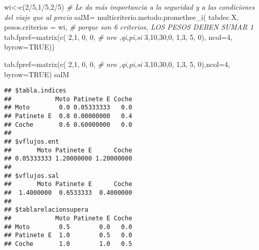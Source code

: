 \documentclass[
]{article}
\newenvironment{Shaded}{\begin{snugshade}}{\end{snugshade}}
\newcommand{\AttributeTok}[1]{\textcolor[rgb]{0.77,0.63,0.00}{#1}}
\newcommand{\CommentTok}[1]{\textcolor[rgb]{0.56,0.35,0.01}{\textit{#1}}}
\newcommand{\ConstantTok}[1]{\textcolor[rgb]{0.00,0.00,0.00}{#1}}
\newcommand{\DecValTok}[1]{\textcolor[rgb]{0.00,0.00,0.81}{#1}}
\newcommand{\FunctionTok}[1]{\textcolor[rgb]{0.00,0.00,0.00}{#1}}
\newcommand{\NormalTok}[1]{#1}
\newcommand{\OtherTok}[1]{\textcolor[rgb]{0.56,0.35,0.01}{#1}}
\newcommand{\SpecialCharTok}[1]{\textcolor[rgb]{0.00,0.00,0.00}{#1}}
\begin{document}
\begin{Shaded}
\begin{Highlighting}[]
\NormalTok{wi}\OtherTok{\textless{}{-}}\FunctionTok{c}\NormalTok{(}\DecValTok{2}\SpecialCharTok{/}\DecValTok{5}\NormalTok{,}\DecValTok{1}\SpecialCharTok{/}\DecValTok{5}\NormalTok{,}\DecValTok{2}\SpecialCharTok{/}\DecValTok{5}\NormalTok{)}
\CommentTok{\# Le da más importancia a la seguridad y a las condiciones del viaje que al precio}
\NormalTok{salM}\OtherTok{=} \FunctionTok{multicriterio.metodo.promethee\_i}\NormalTok{(}
\NormalTok{  tabdec.X,}
  \AttributeTok{pesos.criterios =}\NormalTok{ wi, }\CommentTok{\# porque son 6 criterios, LOS PESOS DEBEN SUMAR 1}
  \AttributeTok{tab.fpref=}\FunctionTok{matrix}\NormalTok{(}\FunctionTok{c}\NormalTok{( }\DecValTok{2}\NormalTok{,}\DecValTok{1}\NormalTok{, }\DecValTok{0}\NormalTok{, }\DecValTok{0}\NormalTok{, }\CommentTok{\# nro ,qi,pi,si}
                      \DecValTok{3}\NormalTok{,}\DecValTok{10}\NormalTok{,}\DecValTok{30}\NormalTok{,}\DecValTok{0}\NormalTok{,}
                      \DecValTok{1}\NormalTok{,}\DecValTok{3}\NormalTok{, }\DecValTok{5}\NormalTok{, }\DecValTok{0}\NormalTok{),}
                   \AttributeTok{ncol=}\DecValTok{4}\NormalTok{,}
                   \AttributeTok{byrow=}\ConstantTok{TRUE}\NormalTok{))}

\NormalTok{  tab.fpref}\OtherTok{=}\FunctionTok{matrix}\NormalTok{(}\FunctionTok{c}\NormalTok{( }\DecValTok{2}\NormalTok{,}\DecValTok{1}\NormalTok{, }\DecValTok{0}\NormalTok{, }\DecValTok{0}\NormalTok{, }\CommentTok{\# nro ,qi,pi,si}
                      \DecValTok{3}\NormalTok{,}\DecValTok{10}\NormalTok{,}\DecValTok{30}\NormalTok{,}\DecValTok{0}\NormalTok{,}
                      \DecValTok{1}\NormalTok{,}\DecValTok{3}\NormalTok{, }\DecValTok{5}\NormalTok{, }\DecValTok{0}\NormalTok{),}\AttributeTok{ncol=}\DecValTok{4}\NormalTok{,}
                   \AttributeTok{byrow=}\ConstantTok{TRUE}\NormalTok{)}
\NormalTok{salM}
\end{Highlighting}
\end{Shaded}

\begin{verbatim}
## $tabla.indices
##            Moto Patinete E Coche
## Moto        0.0 0.05333333   0.0
## Patinete E  0.8 0.00000000   0.4
## Coche       0.6 0.60000000   0.0
## 
## $vflujos.ent
##       Moto Patinete E      Coche 
## 0.05333333 1.20000000 1.20000000 
## 
## $vflujos.sal
##       Moto Patinete E      Coche 
##  1.4000000  0.6533333  0.4000000 
## 
## $tablarelacionsupera
##            Moto Patinete E Coche
## Moto        0.5        0.0   0.0
## Patinete E  1.0        0.5   0.0
## Coche       1.0        1.0   0.5
\end{verbatim}
\end{document}
